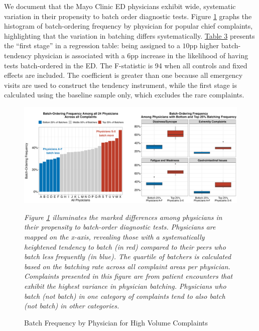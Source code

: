\documentclass[,,nonblindrev]{informs}
\begin{document}
We document that the Mayo Clinic ED physicians exhibit wide, systematic
variation in their propensity to batch order diagnostic tests. Figure
\ref{fig:physician_batching} graphs the histogram of batch-ordering
frequency by physician for popular chief complaints, highlighting that
the variation in batching differs systematically.
\hyperref[tab:regression]{Table 3} presents the ``first stage'' in a
regression table: being assigned to a \(10\)pp higher batch-tendency
physician is associated with a \(6\)pp increase in the likelihood of
having tests batch-ordered in the ED. The F-statistic is 94 when all
controls and fixed effects are included. The coefficient is greater than
one because all emergency visits are used to construct the tendency
instrument, while the first stage is calculated using the baseline
sample only, which excludes the rare complaints.

\begin{figure}[h]
  \centering
  \caption{Batch Frequency by Physician for High Volume Complaints}
  \label{fig:physician_batching}
  \includegraphics[width=1\textwidth]{../outputs/figures/batch_ordering.png}
\begin{tablenotes}
\small
\item \textit{Figure \ref{fig:physician_batching} illuminates the marked differences among physicians in their propensity to batch-order diagnostic tests. Physicians are mapped on the x-axis, revealing those with a systematically heightened tendency to batch (in red) compared to their peers who batch less frequently (in blue). The quartile of batchers is calculated based on the batching rate across all complaint areas per physician. Complaints presented in this figure are from patient encounters that exhibit the highest variance in physician batching. Physicians who batch (not batch) in one category of complaints tend to also batch (not batch) in other categories.}
\end{tablenotes}  
\end{figure}
\end{document}
